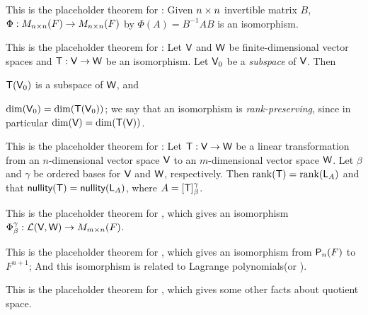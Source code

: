\begin{additional theorem} \label{athm 2.40}
This is the placeholder theorem for :
Given \(n \times n\) invertible matrix \(B\),
\(\Phi : M_{n \times n}(F) \to M_{n \times n}(F)\) by \(\Phi(A) = B^{-1}AB\) is an isomorphism.
\end{additional theorem}

\begin{additional theorem} \label{athm 2.41}
This is the placeholder theorem for :
Let \(\textsf{V}\) and \(\textsf{W}\) be finite-dimensional vector spaces and \(\textsf{T} : \textsf{V} \to \textsf{W}\) be an isomorphism.
Let \(\textsf{V}_0\) be a \emph{subspace} of \(\textsf{V}\).
Then

 \(\textsf{T}(\textsf{V}_0)\) is a subspace of \(\textsf{W}\), and

 \(\dim(\textsf{V}_0) = \dim(\textsf{T}(\textsf{V}_0))\);
    we say that an isomorphism is \emph{rank-preserving}, since in particular \(\dim(\textsf{V}) = \dim(\textsf{T}(\textsf{V}))\).
\end{additional theorem}

\begin{additional theorem} \label{athm 2.42}
This is the placeholder theorem for :
Let \(\textsf{T}: \textsf{V} \to \textsf{W}\) be a linear transformation from an \(n\)-dimensional vector space \(\textsf{V}\) to an \(m\)-dimensional vector space \(\textsf{W}\).
Let \(\beta\) and \(\gamma\) be ordered bases for \(\textsf{V}\) and \(\textsf{W}\), respectively.
Then \(\mathrm{rank}(\textsf{T}) = \mathrm{rank}(\textsf{L}_A)\) and that \(\textsf{nullity}(\textsf{T}) = \textsf{nullity}(\textsf{L}_A)\), where \(A = [\textsf{T}]_{\beta}^{\gamma}\).
\end{additional theorem}

\begin{additional theorem} \label{athm 2.43}
This is the placeholder theorem for , which gives an isomorphism \(\Phi_{\beta}^{\gamma} : \mathcal{L}(\textsf{V}, \textsf{W}) \to M_{m \times n}(F)\).
\end{additional theorem}

\begin{additional theorem} \label{athm 2.44}
This is the placeholder theorem for , which gives an isomorphism from \(\textsf{P}_n(F)\) to \(F^{n + 1}\);
And this isomorphism is related to Lagrange polynomials(or ).
\end{additional theorem}

\begin{additional theorem} \label{athm 2.45}
This is the placeholder theorem for , which gives some other facts about quotient space.
\end{additional theorem}